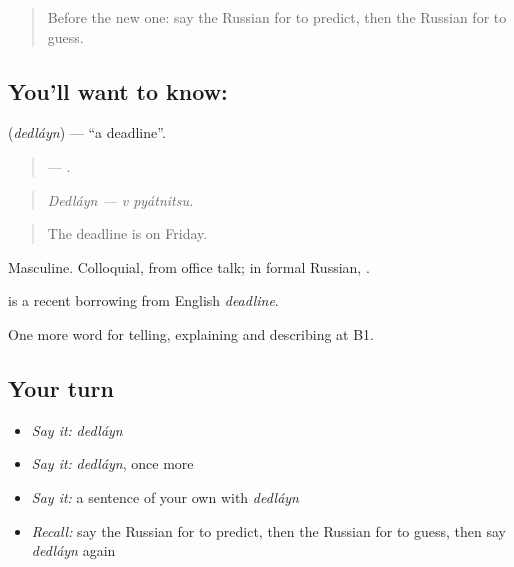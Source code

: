 \label{lesson:RU-C380-dedlayn}



\begin{quote}
Before the new one: say the Russian for to predict, then the Russian for to guess.
\end{quote}

\subsection*{You'll want to know: }
\textbf{} (\emph{dedláyn}) — \textquotedblleft{}a deadline\textquotedblright{}.

\begin{quote}
 —  .
\end{quote}

\begin{quote}
\emph{Dedláyn — v pyátnitsu.}
\end{quote}

\begin{quote}
The deadline is on Friday.
\end{quote}

Masculine. Colloquial, from office talk; in formal Russian, \emph{ }.

\begin{cousinweb}
\textbf{} is a recent borrowing from English \emph{deadline}.
\end{cousinweb}

\begin{grammarlens}[title={What you've built}]
One more word for telling, explaining and describing at B1.
\end{grammarlens}

\subsection*{Your turn}
\begin{itemize}
\raggedright
  \item \emph{Say it:} \emph{dedláyn}
  \item \emph{Say it:} \emph{dedláyn}, once more
  \item \emph{Say it:} a sentence of your own with \emph{dedláyn}
  \item \emph{Recall:} say the Russian for to predict, then the Russian for to guess, then say \emph{dedláyn} again
\end{itemize}

